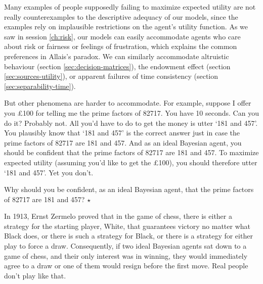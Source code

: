 Many examples of people supposedly failing to maximize expected
utility are not really counterexamples to the descriptive adequacy of
our models, since the examples rely on implausible restrictions on the agent's
utility function. As we saw in session \ref{ch:risk}, our models can easily
accommodate agents who care about risk or fairness or feelings of
frustration, which explains the common preferences in Allais's
paradox. We can similarly accommodate altruistic behaviour (section
\ref{sec:decision-matrices}), the endowment effect (section
\ref{sec:sources-utility}), or apparent failures of time consistency
(section \ref{sec:separability-time}).


But other phenomena are harder to accommodate. For example, suppose I
offer you £100 for telling me the prime factors of 82717. You have 10
seconds. Can you do it? Probably not. All you'd have to do to get the
money is utter `181 and 457'. You plausibly know that `181 and 457' is
the correct answer just in case the prime factors of 82717 are 181 and
457. And as an ideal Bayesian agent, you should be confident that the
prime factors of 82717 are 181 and 457. To maximize expected utility
(assuming you'd like to get the £100), you should therefore utter `181
and 457'. Yet you don't.

\begin{exercise}
  Why should you be confident, as an ideal Bayesian agent, that the
  prime factors of 82717 are 181 and 457? $\star$
\end{exercise}

In 1913, Ernst Zermelo proved that in the game of chess, there is
either a strategy for the starting player, White, that guarantees
victory no matter what Black does, or there is such a strategy for
Black, or there is a strategy for either play to force a
draw. Consequently, if two ideal Bayesian agents sat down to a game of
chess, and their only interest was in winning, they would
immediately agree to a draw or one of them would resign before the
first move. Real people don't play like that.

